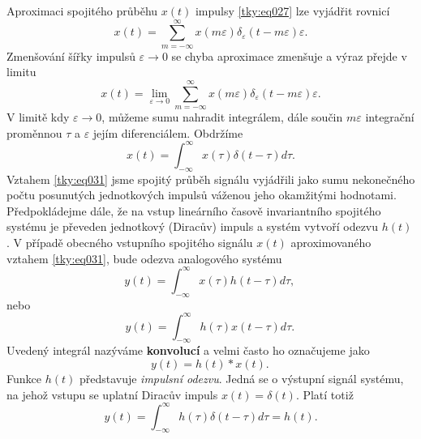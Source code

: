       Aproximaci spojitého průběhu $x(t)$ impulsy \ref{tky:eq027} lze vyjádřit rovnicí
      \begin{equation}\label{tky:eq029}
        x(t)=\sum_{m=-\infty}^\infty x(m\varepsilon)\delta_\varepsilon(t-m\varepsilon)\varepsilon.
      \end{equation}
      Zmenšování šířky impulsů $\varepsilon\rightarrow0$ se chyba aproximace zmenšuje a výraz přejde
      v limitu
      \begin{equation}\label{tky:eq030}
        x(t) = \lim_{\varepsilon\rightarrow0}
               \sum_{m=-\infty}^\infty x(m\varepsilon)\delta_\varepsilon(t-m\varepsilon)\varepsilon.        
      \end{equation}
      V limitě kdy $\varepsilon\rightarrow0$, můžeme sumu nahradit integrálem, dále součin
      $m\varepsilon$ integrační proměnnou $\tau$ a $\varepsilon$ jejím diferenciálem. Obdržíme
      \begin{equation}\label{tky:eq031}
        x(t) = \int_{-\infty}^{\infty}x(\tau)\delta(t-\tau)d\tau .
      \end{equation}
      Vztahem \ref{tky:eq031} jsme spojitý průběh signálu vyjádřili jako sumu
      nekonečného počtu posunutých jednotkových impulsů váženou jeho okamžitými hodnotami.
      Předpokládejme dále, že na vstup lineárního časově invariantního spojitého systému je převeden
      jednotkový (Diracův) impuls a systém vytvoří odezvu $h(t)$. V případě obecného vstupního
      spojitého signálu $x(t)$ aproximovaného vztahem \ref{tky:eq031}, bude odezva
      analogového systému
      \begin{equation}\label{tky:eq032}
        \boxed{y(t) = \int_{-\infty}^{\infty}x(\tau)h(t-\tau)d\tau, \,}
      \end{equation}
      nebo
      \begin{equation}\label{tky:eq033}
        \boxed{y(t) = \int_{-\infty}^{\infty}h(\tau)x(t-\tau)d\tau.\,}
      \end{equation}
      Uvedený integrál nazýváme \textbf{konvolucí} a velmi často ho označujeme jako 
      \begin{equation}\label{tky:eq033}
        \boxed{y(t) = h(t)*x(t).\,}
      \end{equation}
      Funkce $h(t)$ představuje \emph{impulsní odezvu}. Jedná se o výstupní signál systému, na 
      jehož vstupu se uplatní Diracův impuls $x(t)=\delta(t)$. Platí totiž
      \begin{equation}\label{SAS:eq_h_plati}
        y(t) = \int_{-\infty}^{\infty}h(\tau)\delta(t-\tau)d\tau = h(t) . 
      \end{equation}     
